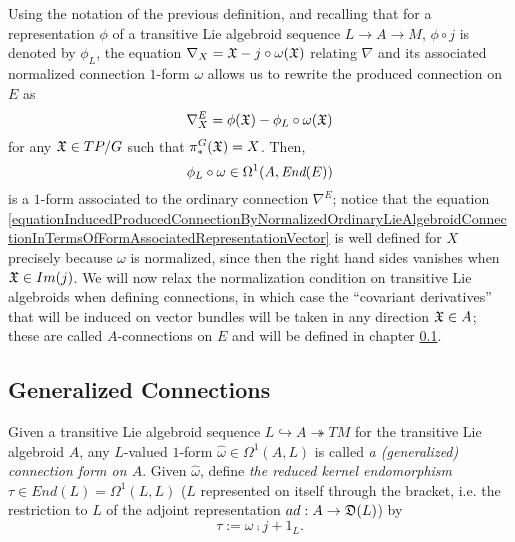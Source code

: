 Using the notation of the previous definition, and recalling that for a representation $\phi$ of a transitive Lie algebroid sequence $L \to A \to M$, $\phi \circ j$ is denoted by $\phi_L$, the equation $\nabla_X = \mathfrak{X} - j \circ \omega(\mathfrak{X})$ relating $\nabla$ and its associated normalized connection $1$-form $\omega$ allows us to rewrite the produced connection on $E$ as
\begin{equation}\label{equationInducedProducedConnectionByNormalizedOrdinaryLieAlgebroidConnectionInTermsOfFormAssociatedRepresentationVector}
    \nabla^E_X = \phi(\oid X) - \phi_L \circ \omega(\oid X)
\end{equation}
for any $\mathfrak{X} \in TP/G$ such that $\pi_*^G(\mathfrak{X}) = X$. Then, 
\begin{equation}
    \phi_L \circ \omega \in \Omega^1(A, \End(E))
\end{equation} 
is a $1$-form associated to the ordinary connection $\nabla^E$; notice that the equation \eqref{equationInducedProducedConnectionByNormalizedOrdinaryLieAlgebroidConnectionInTermsOfFormAssociatedRepresentationVector} is well defined for $X$ precisely because $\omega$ is normalized, since then the right hand sides vanishes when $\mathfrak{X} \in Im(j)$. We will now relax the normalization condition on transitive Lie algebroids when defining connections, in which case the ``covariant derivatives'' that will be induced on vector bundles will be taken in any direction $\mathfrak{X} \in A$; these are called $A$-connections on $E$ and will be defined in chapter \ref{}.

\linea

\subsection{Generalized Connections}

\begin{definition}\label{definitionGeneralizedConnectionFOrmOnTransitiveLieAlgebroidAndTauReducedKernelEndomorphism}
Given a transitive Lie algebroid sequence $L \hookrightarrow A \twoheadrightarrow TM$ for the transitive Lie algebroid $A$, any $L$-valued $1$-form $\hat \omega \in \Omega^1(A, L)$ is called \emph{a (generalized) connection form on $A$}. Given $\hat \omega$, define \emph{the reduced kernel endomorphism $\tau \in End(L) = \Omega^1(L, L)$} ($L$ represented on itself through the bracket, i.e. the restriction to $L$ of the adjoint representation $ad:A \to \mathfrak{D}(L)$) 
 by
\begin{equation}
    \tau := \omega \comp j + 1_L.
\end{equation}
\end{definition}

